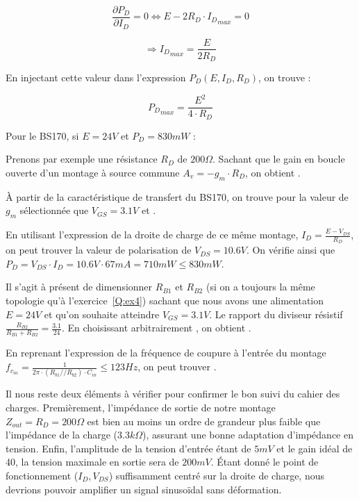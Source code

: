 \documentclass{../template/tp}
\begin{document}
{	$$\frac{\partial P_D}{\partial I_D}=0 \Longleftrightarrow E-2R_D \cdot {I_D}_{max} = 0$$
	
	$$\Longrightarrow {I_D}_{max}=\frac{E}{2R_D}$$

	En injectant cette valeur dans l'expression $P_D(E, I_D, R_D)$, on trouve : 

	$${P_D}_{max}=\frac{E^2}{4\cdot R_D}$$

	Pour le BS170, si $E = 24 V$ et $P_D=830mW$ :  %

Prenons par exemple une résistance $R_D$ de $200 \Omega$.
Sachant que le gain en boucle ouverte d'un montage à source commune $A_v = - g_m \cdot R_D$, on obtient .

À partir de la caractéristique de transfert du BS170, on trouve pour la valeur de $g_m$ sélectionnée que $V_{GS} = 3.1 V$ et .

En utilisant l'expression de la droite de charge de ce même montage, $I_D = \frac{E - V_{DS}}{R_D}$, on peut trouver la valeur de polarisation de $V_{DS} = 10.6 V$.
On vérifie ainsi que $P_D = V_{DS} \cdot I_D = 10.6 V \cdot 67 mA = 710 mW \leq 830 mW$.

Il s'agit à présent de dimensionner $R_{B1}$ et $R_{B2}$ (si on a toujours la même topologie qu'à l'exercice~\ref{Q:ex4}) sachant que nous avons une alimentation $E = 24 V$ et qu'on souhaite atteindre $V_{GS} = 3.1 V$.
Le rapport du diviseur résistif $\frac{R_{B2}}{R_{B1} + R_{B2}} = \frac{3.1}{24}$.
En choisissant arbitrairement , on obtient .

En reprenant l'expression de la fréquence de coupure à l'entrée du montage $f_{c_{in}} = \frac{1}{2\pi\cdot\left(R_{b1}//R_{b2}\right)\cdot C_{in}} \leq 123 Hz$, on peut trouver .

Il nous reste deux éléments à vérifier pour confirmer le bon suivi du cahier des charges.
Premièrement, l'impédance de sortie de notre montage $Z_{out} = R_D = 200 \Omega$ est bien au moins un ordre de grandeur plus faible que l'impédance de la charge ($3.3 k\Omega$), assurant une bonne adaptation d'impédance en tension.
Enfin, l'amplitude de la tension d'entrée étant de $5 mV$ et le gain idéal de 40, la tension maximale en sortie sera de $200 mV$. Étant donné le point de fonctionnement ($I_D, V_{DS}$) suffisamment centré sur  la droite de charge, nous devrions pouvoir amplifier un signal sinusoïdal sans déformation.


}
\end{document}
